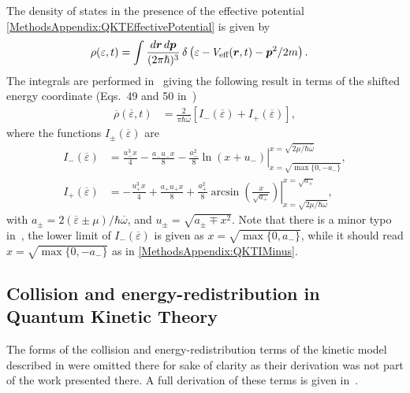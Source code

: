 The density of states in the presence of the effective potential \eqref{MethodsAppendix:QKTEffectivePotential} is given by
\begin{align}
    \rho(\varepsilon, t) &= \int \frac{d \vect{r}\, d \vect{p}}{(2\pi \hbar)^3} \,\delta\left(\varepsilon - V_\text{eff}(\vect{r}, t) - \vect{p}^2/2 m\right).
    \label{MethodsAppendix:DensityOfStatesDefinition}
\end{align}
The integrals are performed in~\citep{Bijlsma:2000} giving the following result in terms of the shifted energy coordinate (Eqs.~49 and 50 in~\citep{Bijlsma:2000})
\begin{align}
    \overline{\rho}(\overline{\varepsilon}, t) &= \frac{2}{\pi \hbar \overline{\omega}} \left[I_-(\overline{\varepsilon}) + I_+(\overline{\varepsilon})\right],
\end{align}
where the functions $I_\pm(\overline{\varepsilon})$ are
\begin{align}
    I_-(\overline{\varepsilon}) &= \left.\frac{u_-^3 x}{4} - \frac{a_- u_- x}{8} - \frac{a_-^2}{8}\ln(x + u_-)\right|_{x=\sqrt{\max\{0, -a_-\}}}^{x=\sqrt{2\mu/\hbar \overline{\omega}}}, \label{MethodsAppendix:QKTIMinus}\\
    I_+(\overline{\varepsilon}) &= \left.- \frac{u_+^3 x}{4} + \frac{a_+ u_+ x}{8} + \frac{a_+^2}{8} \arcsin\left(\frac{x}{\sqrt{a_+}}\right)\right|_{x=\sqrt{2\mu/\hbar\overline{\omega}}}^{x=\sqrt{a_+}}, \label{MethodsAppendix:QKTIPlus}
\end{align}
with $a_\pm = 2(\overline{\varepsilon}\pm \mu)/\hbar\overline{\omega}$, and $u_\pm = \sqrt{a_\pm \mp x^2}$. Note that there is a minor typo in~\citet{Bijlsma:2000}, the lower limit of $I_-(\overline{\varepsilon})$ is given as $x=\sqrt{\max\{0, a_-\}}$, while it should read $x=\sqrt{\max\{0, -a_-\}}$ as in \eqref{MethodsAppendix:QKTIMinus}.

\subsection{Collision and energy-redistribution in Quantum Kinetic Theory}
\label{MethodsAppendix:QKTOtherTerms}

The forms of the collision and energy-redistribution terms of the kinetic model described in  were omitted there for sake of clarity as their derivation was not part of the work presented there.  A full derivation of these terms is given in~\citep{Bijlsma:2000,Proukakis:2008}.

